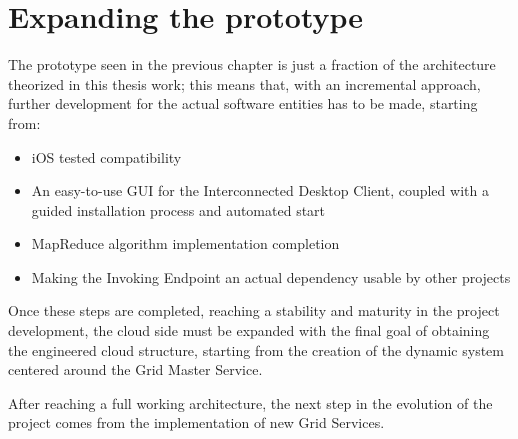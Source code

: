 \section{Expanding the prototype}
The prototype seen in the previous chapter is just a fraction of the architecture theorized in this thesis work; this means that, with an incremental approach, further development for the actual software entities has to be made, starting from:
\begin{itemize}
    \item iOS tested compatibility
    \item An easy-to-use GUI for the Interconnected Desktop Client, coupled with a guided installation process and automated start
    \item MapReduce algorithm implementation completion
    \item Making the Invoking Endpoint an actual dependency usable by other projects
\end{itemize}

Once these steps are completed, reaching a stability and maturity in the project development, the cloud side must be expanded with the final goal of obtaining the engineered cloud structure, starting from the creation of the dynamic system centered around the Grid Master Service.

After reaching a full working architecture, the next step in the evolution of the project comes from the implementation of new Grid Services.